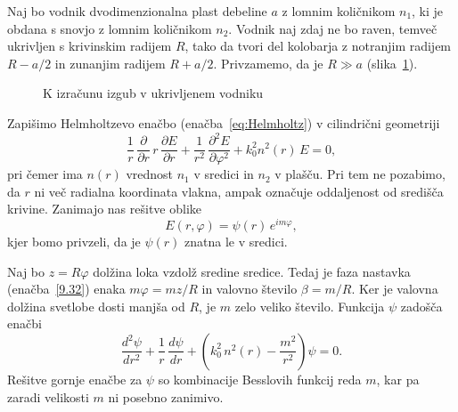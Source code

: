 Naj bo vodnik dvodimenzionalna plast debeline $a$ z lomnim količnikom
$n_{1}$, ki je obdana s snovjo z lomnim količnikom $n_{2}$. Vodnik naj
zdaj ne bo raven, temveč ukrivljen s krivinskim radijem $R$, tako da tvori 
del kolobarja z notranjim radijem $R-a/2$ in zunanjim radijem $R+a/2$.
Privzamemo, da je $R\gg a$ (slika~\ref{fig:bend}). 
\begin{figure}[h]
\centering
\def\svgwidth{50truemm} 
 
\caption{K izračunu izgub v ukrivljenem vodniku}
\label{fig:bend}
\end{figure}

Zapišimo Helmholtzevo enačbo (enačba~\ref{eq:Helmholtz}) v cilindrični 
geometriji
\begin{equation}
\frac{1}{r}\,\frac{\partial}{\partial r}\, r\,\frac{\partial E}{\partial r}
+\frac{1}{r^{2}}\,\frac{\partial^{2}E}{\partial\varphi^{2}}+k_{0}^{2}n^{2}\left(r\right)\, E=0,
\label{9.31}
\end{equation}
pri čemer ima $n\left(r\right)$ vrednost $n_{1}$ v sredici in $n_{2}$ v plašču. 
Pri tem ne pozabimo, da $r$ ni več radialna koordinata vlakna, ampak
označuje oddaljenost od središča krivine. Zanimajo nas rešitve oblike 
\begin{equation}
E(r, \varphi) =\psi\left(r\right)\, e^{im\varphi},
\label{9.32}
\end{equation}
kjer bomo privzeli, da je $\psi\left(r\right)$ znatna le v sredici. 

Naj bo $z=R\varphi$ dolžina loka vzdolž sredine sredice. Tedaj je faza nastavka
(enačba~\ref{9.32}) enaka $m\varphi = m z/R$ in valovno število $\beta = m/R$.
Ker je valovna dolžina svetlobe dosti manjša od $R$, je $m$ zelo veliko število. 
Funkcija $\psi$ zadošča enačbi 
\begin{equation}
\frac{d^{2}\psi}{dr^{2}}+\frac{1}{r}\,\frac{d\psi}{dr}+\left(k_{0}^{2}\, 
n^{2}\left(r\right)-\frac{m^{2}}{r^{2}}\right)\psi=0.
\label{9.33}
\end{equation}
Rešitve gornje enačbe za $\psi$ so kombinacije Besslovih funkcij reda $m$, kar
pa zaradi velikosti $m$ ni posebno zanimivo. 

